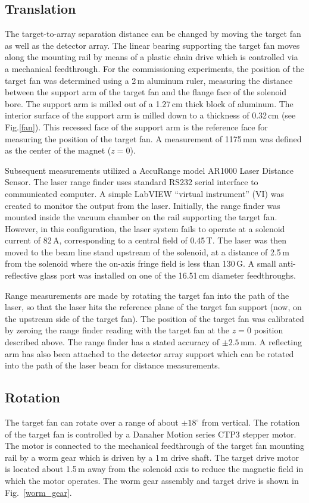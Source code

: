 \subsection{Translation}
\label{fantrans}
The target-to-array separation distance can be changed by moving the target fan as well as the detector array.  The linear bearing supporting the target fan moves along the mounting rail by means of a plastic chain drive which is controlled via a mechanical feedthrough. For the commissioning experiments, the position of the target fan was determined using a 2\,m aluminum ruler, measuring the distance between the support arm of the target fan and the flange face of the solenoid bore.  The support arm is milled out of a 1.27\,cm thick block of aluminum.  The interior surface of the support arm is milled down to a thickness of 0.32\,cm (see Fig.\ref{fan}).  This recessed face of the support arm is the reference face for measuring the position of the target fan.  A measurement of 1175\,mm was defined as the center of the magnet ($z=0$).

Subsequent measurements utilized a AccuRange model AR1000 Laser Distance Sensor.  The laser range finder uses standard RS232 serial interface to communicated computer.  A simple LabVIEW\texttrademark{} ``virtual instrument'' (VI) was created to monitor the output from the laser.  Initially, the range finder was mounted inside the vacuum chamber on the rail supporting the target fan.  However, in this configuration, the laser system fails to operate at a solenoid current of 82\,A, corresponding to a central field of 0.45\,T.  The laser was then moved to the beam line stand upstream of the solenoid, at a distance of 2.5\,m from the solenoid where the on-axis fringe field is less than 130\,G.  A small anti-reflective glass port was installed on one of the 16.51\,cm diameter feedthroughs.

Range measurements are made by rotating the target fan into the path of the laser, so that the laser hits the reference plane of the target fan support (now, on the upstream side of the target fan).  The position of the target fan was calibrated by zeroing the range finder reading with the target fan at the $z=0$ position described above.  The range finder has a stated accuracy of $\pm 2.5$\,mm.  A reflecting arm has also been attached to the detector array support which can be rotated into the path of the laser beam for distance measurements.

\subsection{Rotation}
The target fan can rotate over a range of about $\pm 18^\circ$ from vertical.  The rotation of the target fan is controlled by a Danaher Motion series CTP3 stepper motor.   The motor is connected to the mechanical feedthrough of the target fan mounting rail by a worm gear which is driven by a 1\,m drive shaft.  The target drive motor is located about 1.5\,m away from the solenoid axis to reduce the magnetic field in which the motor operates. The worm gear assembly and target drive is shown in Fig.~\ref{worm_gear}.

